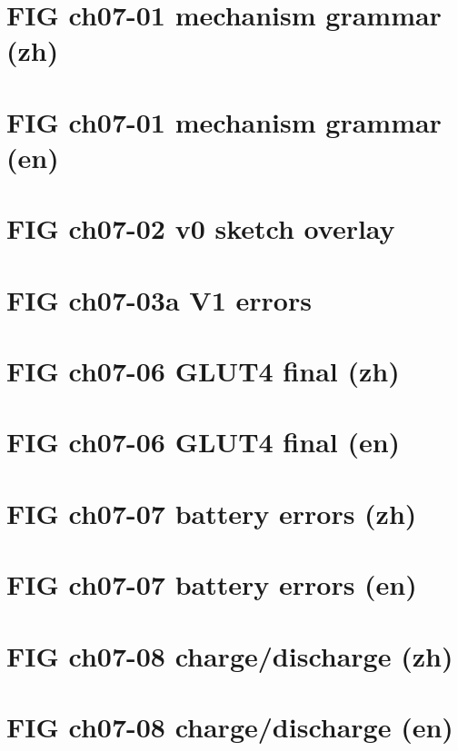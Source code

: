 \documentclass[UTF8,fontset=fandol,10pt]{ctexart}
\begin{document}
\section*{FIG ch07-01 mechanism grammar (zh)}

\newpage
\section*{FIG ch07-01 mechanism grammar (en)}

\newpage
\section*{FIG ch07-02 v0 sketch overlay}

\newpage
\section*{FIG ch07-03a V1 errors}

\newpage
\section*{FIG ch07-06 GLUT4 final (zh)}

\newpage
\section*{FIG ch07-06 GLUT4 final (en)}

\newpage
\section*{FIG ch07-07 battery errors (zh)}

\newpage
\section*{FIG ch07-07 battery errors (en)}

\newpage
\section*{FIG ch07-08 charge/discharge (zh)}

\newpage
\section*{FIG ch07-08 charge/discharge (en)}

\end{document}
